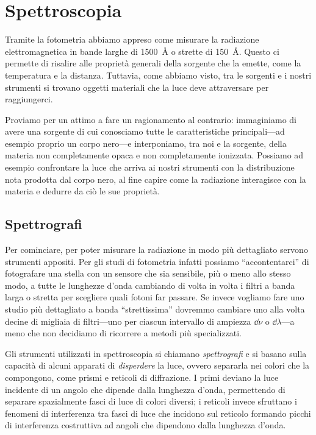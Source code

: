 \chapter{Spettroscopia}
Tramite la fotometria abbiamo appreso come misurare la radiazione elettromagnetica in bande larghe di \SI{1500}{\angstrom} o strette di \SI{150}{\angstrom}. Questo ci permette di risalire alle proprietà generali della sorgente che la emette, come la temperatura e la distanza. Tuttavia, come abbiamo visto, tra le sorgenti e i nostri strumenti si trovano oggetti materiali che la luce deve attraversare per raggiungerci.

Proviamo per un attimo a fare un ragionamento al contrario: immaginiamo di avere una sorgente di cui conosciamo tutte le caratteristiche principali---ad esempio proprio un corpo nero---e interponiamo, tra noi e la sorgente, della materia non completamente opaca e non completamente ionizzata. Possiamo ad esempio confrontare la luce che arriva ai nostri strumenti con la distribuzione nota prodotta dal corpo nero, al fine capire come la radiazione interagisce con la materia e dedurre da ciò le sue proprietà.
\section{Spettrografi}\label{s:spettrografi}
    Per cominciare, per poter misurare la radiazione in modo più dettagliato servono strumenti appositi. Per gli studi di fotometria infatti possiamo ``accontentarci'' di fotografare una stella con un sensore che sia sensibile, più o meno allo stesso modo, a tutte le lunghezze d'onda cambiando di volta in volta i filtri a banda larga o stretta per scegliere quali fotoni far passare. Se invece vogliamo fare uno studio più dettagliato a banda ``strettissima'' dovremmo cambiare uno alla volta decine di migliaia di filtri---uno per ciascun intervallo di ampiezza $\dd{\nu}$ o $\dd{\lambda}$---a meno che non decidiamo di ricorrere a metodi più specializzati.

    Gli strumenti utilizzati in spettroscopia si chiamano \emph{spettrografi} e si basano sulla capacità di alcuni apparati di \emph{disperdere} la luce, ovvero separarla nei colori che la compongono, come prismi e reticoli di diffrazione. I primi deviano la luce incidente di un angolo che dipende dalla lunghezza d'onda, permettendo di separare spazialmente fasci di luce di colori diversi; i reticoli invece sfruttano i fenomeni di interferenza tra fasci di luce che incidono sul reticolo formando picchi di interferenza costruttiva ad angoli che dipendono dalla lunghezza d'onda.

